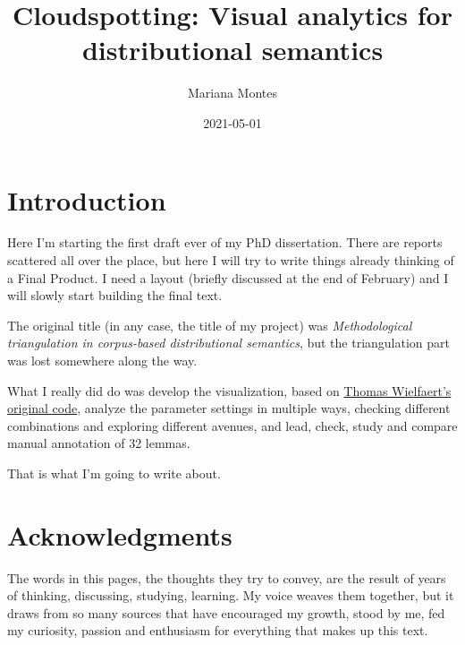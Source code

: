 \documentclass[
]{book}
\title{Cloudspotting: Visual analytics for distributional semantics}
\author{Mariana Montes}
\date{2021-05-01}
\newenvironment{Shaded}{\begin{snugshade}}{\end{snugshade}}
\newcommand{\AttributeTok}[1]{\textcolor[rgb]{0.77,0.63,0.00}{#1}}
\newcommand{\ConstantTok}[1]{\textcolor[rgb]{0.00,0.00,0.00}{#1}}
\newcommand{\FunctionTok}[1]{\textcolor[rgb]{0.00,0.00,0.00}{#1}}
\newcommand{\NormalTok}[1]{#1}
\newcommand{\SpecialCharTok}[1]{\textcolor[rgb]{0.00,0.00,0.00}{#1}}
\begin{document}
\maketitle

{
\setcounter{tocdepth}{1}
\tableofcontents
}
\begin{Shaded}
\end{Shaded}

\hypertarget{introduction}{%
\chapter*{Introduction}\label{introduction}}

Here I'm starting the first draft ever of my PhD dissertation.
There are reports scattered all over the place, but here I will try to write things already
thinking of a Final Product. I need a layout (briefly discussed at the end of February) and
I will slowly start building the final text.

The original title (in any case, the title of my project) was
\emph{Methodological triangulation in corpus-based distributional semantics},
but the triangulation part was lost somewhere along the way.

What I really did do was develop the visualization,
based on \href{https://github.com/tokenclouds/tokenclouds.github.io}{Thomas Wielfaert's original code},
analyze the parameter settings in multiple ways,
checking different combinations and exploring different avenues,
and lead, check, study and compare manual annotation of 32 lemmas.

That is what I'm going to write about.

\hypertarget{acknowledgments}{%
\chapter*{Acknowledgments}\label{acknowledgments}}

The words in this pages, the thoughts they try to convey, are the result of
years of thinking, discussing, studying, learning. My voice weaves them together,
but it draws from so many sources that have encouraged my growth, stood by me,
fed my curiosity, passion and enthusiasm for everything that makes up this text.
\end{document}

